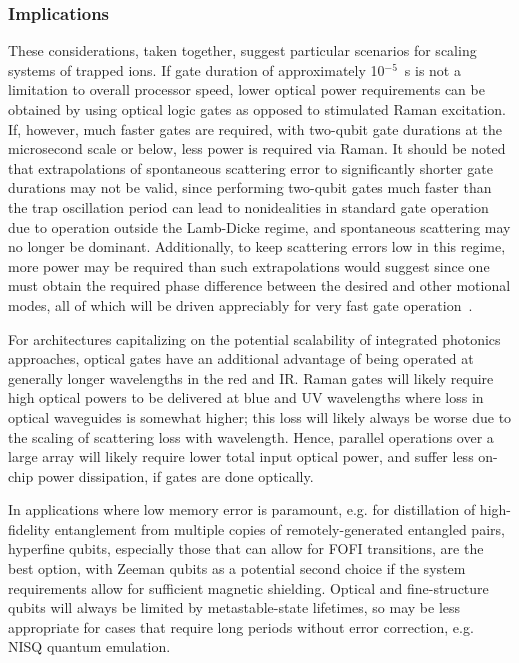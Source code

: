 \documentclass[%
reprint,
 amsmath,amssymb,
]{revtex4-1}
\begin{document}
\subsubsection{Implications}

These considerations, taken together, suggest particular scenarios for scaling systems of trapped ions.  If gate duration of approximately 10$^{-5}$~s is not a limitation to overall processor speed, lower optical power requirements can be obtained by using optical logic gates as opposed to stimulated Raman excitation.  If, however, much faster gates are required, with two-qubit gate durations at the microsecond scale or below, less power is required via Raman. It should be noted that extrapolations of spontaneous scattering error to significantly shorter gate durations may not be valid, since performing two-qubit gates much faster than the trap oscillation period can lead to nonidealities in standard gate operation due to operation outside the Lamb-Dicke regime, and spontaneous scattering may no longer be dominant.  Additionally, to keep scattering errors low in this regime, more power may be required than such extrapolations would suggest since one must obtain the required phase difference between the desired and other motional modes, all of which will be driven appreciably for very fast gate operation~\cite{SteanePulseGates2014}.

For architectures capitalizing on the potential scalability of integrated photonics approaches, optical gates have an additional advantage of being operated at generally longer wavelengths in the red and IR. Raman gates will likely require high optical powers to be delivered at blue and UV wavelengths where loss in optical waveguides is somewhat higher; this loss will likely always be worse due to the scaling of scattering loss with wavelength.  Hence, parallel operations over a large array will likely require lower total input optical power, and suffer less on-chip power dissipation, if gates are done optically.

In applications where low memory error is paramount, e.g. for distillation of high-fidelity entanglement from multiple copies of remotely-generated entangled pairs, hyperfine qubits, especially those that can allow for FOFI transitions, are the best option, with Zeeman qubits as a potential second choice if the system requirements allow for sufficient magnetic shielding.  Optical and fine-structure qubits will always be limited by metastable-state lifetimes, so may be less appropriate for cases that require long periods without error correction, e.g. NISQ quantum emulation.
\end{document}
